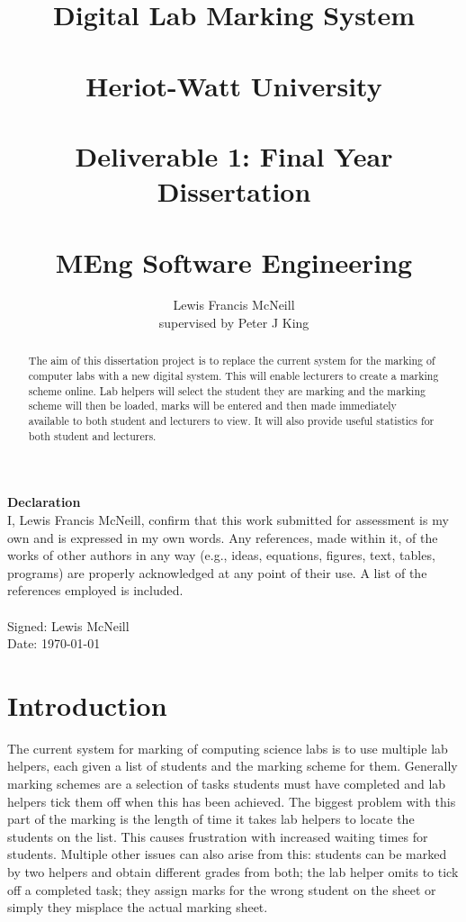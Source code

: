 \documentclass[12pt]{article}  %
\title{Digital Lab Marking System \\~\\  \large{Heriot-Watt University} \\~\\ Deliverable 1: Final Year Dissertation \\~\\ MEng Software Engineering}
\author{Lewis Francis McNeill\\
supervised by
Peter J King}
\begin{document}
\maketitle
{}



\newpage
\setcounter{page}{1}
\doublespacing
\textbf{\Large{Declaration}} \\[2em]
I, Lewis Francis McNeill, confirm that this work submitted for assessment is my own and is expressed in my own words. Any references, made within it, of the works of other authors in any way (e.g., ideas, equations, figures, text, tables, programs) are properly acknowledged at any point of their use. A list of the references employed is included.
\\
\\
Signed: Lewis McNeill
\\
Date: \today


\newpage               
\begin{abstract}
\noindent
The aim of this dissertation project is to replace the current system for the marking of computer labs with a new digital system. This will enable lecturers to create a marking scheme online. Lab helpers will select the student they are marking and the marking scheme will then be loaded, marks will be entered and then made immediately available to both student and lecturers to view. It will also provide useful statistics for both student and lecturers.
\end{abstract}
\newpage 

\tableofcontents
\newpage
\listoffigures
\listoftables


\newpage   
\setcounter{page}{1}
\section{Introduction}

The current system for marking of computing science labs is to use multiple lab helpers, each given a list of students and the marking scheme for them. Generally marking schemes are a selection of tasks students must have completed and lab helpers tick them off when this has been achieved. The biggest problem with this part of the marking is the length of time it takes lab helpers to locate the students on the list. This causes frustration with increased waiting times for students.  Multiple other issues  can also  arise from this: students can be marked by two helpers and obtain different grades from both; the lab helper omits to  tick off a completed task; they assign  marks for the wrong student on the sheet or simply they misplace the actual marking sheet.
\end{document}
